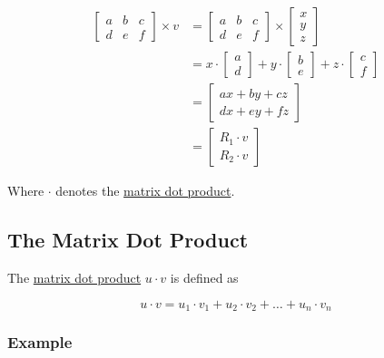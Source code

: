 \documentclass[12pt]{article}
\begin{document}
\begin{align}
  \begin{bmatrix}
    a & b & c \\ d & e & f 
  \end{bmatrix}
  \times
  v 
  &=
  \begin{bmatrix}
    a & b & c \\
    d & e & f 
  \end{bmatrix}
  \times
  \begin{bmatrix}
    x \\ y \\ z
  \end{bmatrix} \\
  &= 
  x \cdot \begin{bmatrix} a \\ d \end{bmatrix}
  + y \cdot \begin{bmatrix} b \\ e \end{bmatrix}
  + z \cdot \begin{bmatrix} c \\ f \end{bmatrix} \\
  &=
  \begin{bmatrix}
    ax + by + cz \\
    dx + ey + fz
  \end{bmatrix} \\
  &=
  \begin{bmatrix}
    R_{1} \cdot v \\
    R_{2} \cdot v
  \end{bmatrix}
\end{align}

Where \( \cdot \) denotes the \underline{matrix dot product}.

\subsection{The Matrix Dot Product}

The \underline{matrix dot product} \( u \cdot v \) is defined as

\begin{equation}
  u \cdot v = u_{1} \cdot v_{1} + u_{2} \cdot v_{2} + \ldots + u_{n} \cdot v_{n}
\end{equation}

\subsubsection{Example}
\end{document}
